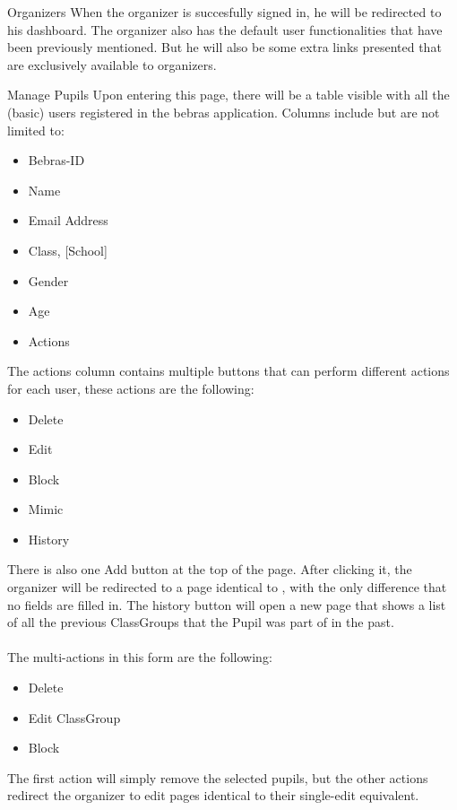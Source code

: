 \begin{section}{Organizers}
	When the organizer is succesfully signed in, he will be redirected to his dashboard.
	The organizer also has the default user functionalities that have been previously
	mentioned. But he will also be some extra links presented that are exclusively
	available to organizers.
	
	\begin{subsection}{Manage Pupils}
		\label{sec:organizer_manage_pupils}
		Upon entering this page, there will be a table visible with all the (basic) users
		registered in the bebras application. Columns include but are not limited to:
		\begin{itemize}
			\item Bebras-ID
			\item Name
			\item Email Address
			\item Class, [School]
			\item Gender
			\item Age
			\item Actions
		\end{itemize}
		The actions column contains multiple buttons that can perform different actions
		for each user, these actions are the following:
		\begin{itemize}
			\item Delete
			\item Edit
			\item Block
			\item Mimic
			\item History
		\end{itemize}
		There is also one Add button at the top of the page. After clicking it, the
		organizer will be redirected to a page identical to
		, with the only difference that no fields
		are filled in. The history button will open a new page that shows a list of all
		the previous ClassGroups that the Pupil was part of in the past. \\
		\\
		The multi-actions in this form are the following:
		\begin{itemize}
			\item Delete
			\item Edit ClassGroup
			\item Block
		\end{itemize}
		The first action will simply remove the selected pupils, but the other actions
		redirect the organizer to edit pages identical to their single-edit equivalent.

\end{subsection}
\end{section}
